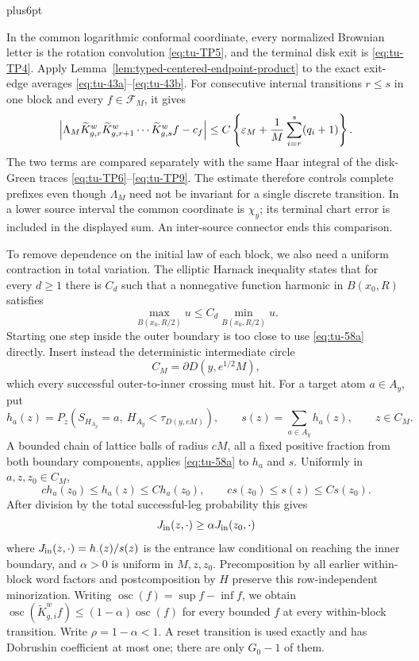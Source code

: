 \documentclass[12pt,reqno]{amsart}
\makeatletter
\theoremstyle{plain}
\theoremstyle{definition}
\theoremstyle{remark}
\renewenvironment{proof}[1][\proofname]{%
  \par
  \pushQED{\qed}%
  \normalfont
  \topsep6pt plus6pt\relax
  \trivlist
  \item[\hskip\labelsep\slshape #1\@addpunct{.}]%
  \ignorespaces
}{%
  \popQED
  \endtrivlist
  \@endpefalse
}
\DeclareRobustCommand{\qed}{%
  \leavevmode\unskip\penalty9999\hbox{}\nobreak
  \ifmmode
    \makebox[0pt][l]{\qquad\hbox{\qedsymbol}}%
  \else
    \qquad\hbox{\qedsymbol}%
  \fi
}
\renewcommand{\qedsymbol}{\rule[.47pt]{4pt}{6pt}}
\numberwithin{equation}{section}
\makeatother
\begin{document}
\begin{proof}[Proof of Lemma~\ref{lem:terminal-feynman-kac}]
In the common logarithmic conformal coordinate, every normalized Brownian
letter is the rotation convolution \eqref{eq:tu-TP5}, and the terminal disk exit is
\eqref{eq:tu-TP4}.  Apply Lemma~\ref{lem:typed-centered-endpoint-product} to the exact
exit-edge averages \eqref{eq:tu-43a}--\eqref{eq:tu-43b}.  For consecutive internal transitions
\(r\le s\) in one block and every \(f\in\mathcal{F}_M\), it gives
\begin{equation}
 \left|\Lambda_M
   \widetilde K_{g,r}^w\widetilde K_{g,r+1}^w\cdots
   \widetilde K_{g,s}^wf-c_f\right|
 \le C\left\{\varepsilon_M+
       {1\over M}\sum_{i=r}^s(q_i+1)\right\}.              \label{eq:tu-58e}
\end{equation}
The two terms are compared separately with the same Haar integral of the
disk-Green traces \eqref{eq:tu-TP6}--\eqref{eq:tu-TP9}. The estimate therefore controls complete
prefixes even though \(\Lambda_M\) need not be invariant for a single
discrete transition. In a lower source interval the common coordinate is
\(\chi_y\); its terminal chart error is included in the displayed sum.
An inter-source connector ends this comparison.

To remove dependence on the initial law of each block, we also need a
uniform contraction in total variation. The elliptic Harnack inequality
\cite[Theorem~1.1]{AthreyaEtAl2022} states that for every \(d\ge1\)
there is \(C_d\) such that a nonnegative function harmonic in
\(B(x_0,R)\) satisfies
\begin{equation}
       \max_{B(x_0,R/2)}u\le C_d\min_{B(x_0,R/2)}u.           \label{eq:tu-58a}
\end{equation}
Starting one step inside the outer boundary is too close to use \eqref{eq:tu-58a}
directly.  Insert instead the deterministic intermediate circle
\[
                 C_M=\partial D(y,e^{1/2}M),
\]
which every successful outer-to-inner crossing must hit.  For a target
atom \(a\in A_y\), put
\[
 h_a(z)=P_z(S_{H_{A_y}}=a,\ H_{A_y}<\tau_{D(y,eM)}),
 \qquad s(z)=\sum_{a\in A_y}h_a(z),\qquad z\in C_M.
\]
A bounded chain of lattice balls of radius \(cM\), all a fixed positive
fraction from both boundary components, applies \eqref{eq:tu-58a} to \(h_a\) and
\(s\).  Uniformly in \(a,z,z_0\in C_M\),
\[
 ch_a(z_0)\le h_a(z)\le Ch_a(z_0),\qquad
 cs(z_0)\le s(z)\le Cs(z_0).
\]
After division by the total successful-leg probability this gives
\begin{equation}
       J_{\rm in}(z,\cdot)\ge\alpha
                     J_{\rm in}(z_0,\cdot)                  \label{eq:tu-58b}
\end{equation}
where \(J_{\rm in}(z,\cdot)=h_{\cdot}(z)/s(z)\) is the entrance
law conditional on reaching the inner boundary, and \(\alpha>0\) is
uniform in \(M,z,z_0\). Precomposition by all earlier
within-block word factors and postcomposition by \(H\) preserve this row-independent
minorization. Writing \(\operatorname{osc}(f)=\sup f-\inf f\), we obtain
\(\operatorname {osc}(\widetilde K_{g,i}^wf)\le(1-\alpha)
\operatorname {osc}(f)\) for every bounded \(f\) at every within-block
transition.  Write \(\rho=1-\alpha<1\).  A reset transition is used
exactly and has Dobrushin coefficient at most one; there are only
\(G_0-1\) of them.


\end{proof}
\end{document}
